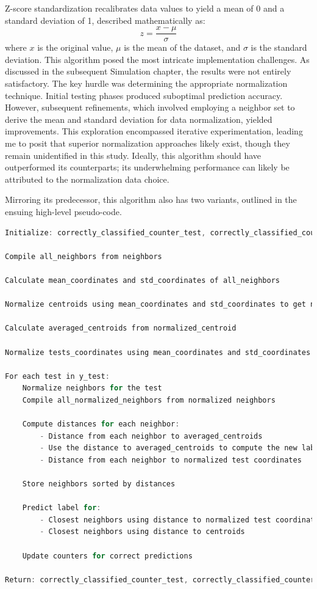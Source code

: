 Z-score standardization recalibrates data values to yield a mean of 0 and a standard deviation of 1, described mathematically as:
\[ z = \frac{x - \mu}{\sigma} \] where \( x \) is the original value, \( \mu \) is the mean of the dataset, and \( \sigma \) is the standard deviation.
This algorithm posed the most intricate implementation challenges. As discussed in the subsequent Simulation chapter, the results were not entirely satisfactory. The key hurdle was determining the appropriate normalization technique. Initial testing phases produced suboptimal prediction accuracy. However, subsequent refinements, which involved employing a neighbor set to derive the mean and standard deviation for data normalization, yielded improvements. This exploration encompassed iterative experimentation, leading me to posit that superior normalization approaches likely exist, though they remain unidentified in this study. Ideally, this algorithm should have outperformed its counterparts; its underwhelming performance can likely be attributed to the normalization data choice.

Mirroring its predecessor, this algorithm also has two variants, outlined in the ensuing high-level pseudo-code.  


\begin{lstlisting}[language=C]
Initialize: correctly_classified_counter_test, correctly_classified_counter_centroids, all_neighbors

Compile all_neighbors from neighbors

Calculate mean_coordinates and std_coordinates of all_neighbors

Normalize centroids using mean_coordinates and std_coordinates to get normalized_centroid

Calculate averaged_centroids from normalized_centroid

Normalize tests_coordinates using mean_coordinates and std_coordinates

For each test in y_test:
    Normalize neighbors for the test
    Compile all_normalized_neighbors from normalized neighbors

    Compute distances for each neighbor:
        - Distance from each neighbor to averaged_centroids
        - Use the distance to averaged_centroids to compute the new labels
        - Distance from each neighbor to normalized test coordinates

    Store neighbors sorted by distances

    Predict label for:
        - Closest neighbors using distance to normalized test coordinates
        - Closest neighbors using distance to centroids

    Update counters for correct predictions

Return: correctly_classified_counter_test, correctly_classified_counter_centroids

\end{lstlisting}

